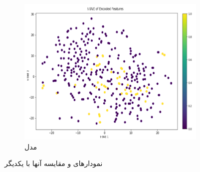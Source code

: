 \begin{figure}[h!]
\begin{subfigure}{0.33\textwidth}
			\includegraphics[width=\linewidth]{Images/Chapter3/tsne-other.png}
			\caption{مدل  
			\cite{Ganeshkumar2022Identification}}
			\label{fig:ch3-tsne-other}
        \end{subfigure}
		\caption{نمودارهای 
		و مقایسه آنها با یکدیگر}
		\label{fig:ch3-tsne}
\end{figure}